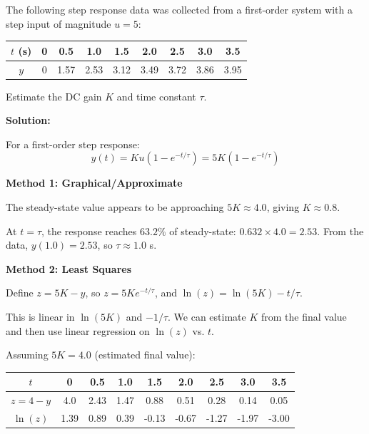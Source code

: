 \begin{examplebox}
\label{ex:step_estimation}
The following step response data was collected from a first-order system with a step input of magnitude $u = 5$:

\begin{center}
\begin{tabular}{ccccccccc}
\toprule
$t$ (s) & 0 & 0.5 & 1.0 & 1.5 & 2.0 & 2.5 & 3.0 & 3.5 \\
\midrule
$y$ & 0 & 1.57 & 2.53 & 3.12 & 3.49 & 3.72 & 3.86 & 3.95 \\
\bottomrule
\end{tabular}
\end{center}

Estimate the DC gain $K$ and time constant $\tau$.

\textbf{Solution:}

For a first-order step response:
\begin{equation*}
y(t) = Ku(1 - e^{-t/\tau}) = 5K(1 - e^{-t/\tau})
\end{equation*}

\textbf{Method 1: Graphical/Approximate}

The steady-state value appears to be approaching $5K \approx 4.0$, giving $K \approx 0.8$.

At $t = \tau$, the response reaches $63.2\%$ of steady-state: $0.632 \times 4.0 = 2.53$.
From the data, $y(1.0) = 2.53$, so $\tau \approx 1.0$ s.

\textbf{Method 2: Least Squares}

Define $z = 5K - y$, so $z = 5K e^{-t/\tau}$, and $\ln(z) = \ln(5K) - t/\tau$.

This is linear in $\ln(5K)$ and $-1/\tau$. We can estimate $K$ from the final value and then use linear regression on $\ln(z)$ vs. $t$.

Assuming $5K = 4.0$ (estimated final value):
\begin{center}
\begin{tabular}{ccccccccc}
\toprule
$t$ & 0 & 0.5 & 1.0 & 1.5 & 2.0 & 2.5 & 3.0 & 3.5 \\
\midrule
$z = 4 - y$ & 4.0 & 2.43 & 1.47 & 0.88 & 0.51 & 0.28 & 0.14 & 0.05 \\
$\ln(z)$ & 1.39 & 0.89 & 0.39 & -0.13 & -0.67 & -1.27 & -1.97 & -3.00 \\
\bottomrule
\end{tabular}
\end{center}


\end{examplebox}
